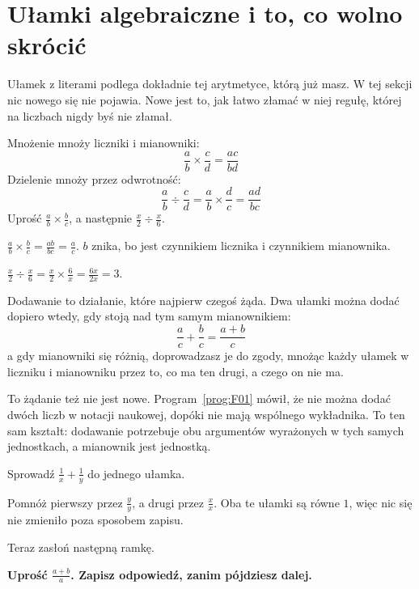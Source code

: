 \section{Ułamki algebraiczne i to, co wolno skrócić}
\label{sec:F02-fractions}

\begin{fr}
Ułamek z literami podlega dokładnie tej arytmetyce, którą już masz. W tej
sekcji nic nowego się nie pojawia. Nowe jest to, jak łatwo złamać w niej
regułę, której na liczbach nigdy byś nie złamał.

Mnożenie mnoży liczniki i mianowniki:
\[ \frac{a}{b} \times \frac{c}{d} = \frac{ac}{bd} \]
Dzielenie mnoży przez odwrotność:
\[ \frac{a}{b} \div \frac{c}{d} = \frac{a}{b} \times \frac{d}{c}
   = \frac{ad}{bc} \]
Uprość $\frac{a}{b} \times \frac{b}{c}$, a następnie
$\frac{x}{2} \div \frac{x}{6}$.
\dotline
\nextframe
\end{fr}

\begin{fr}
\begin{ansblock}
$\frac{a}{b} \times \frac{b}{c} = \frac{ab}{bc} = \frac{a}{c}$. $b$
znika, bo jest czynnikiem licznika i czynnikiem mianownika.

$\frac{x}{2} \div \frac{x}{6} = \frac{x}{2} \times \frac{6}{x}
= \frac{6x}{2x} = 3$.
\end{ansblock}

Dodawanie to działanie, które najpierw czegoś żąda. Dwa ułamki można dodać
dopiero wtedy, gdy stoją nad tym samym mianownikiem:
\[ \frac{a}{c} + \frac{b}{c} = \frac{a + b}{c} \]
a gdy mianowniki się różnią, doprowadzasz je do zgody, mnożąc każdy ułamek w
liczniku i mianowniku przez to, co ma ten drugi, a czego on nie ma.

To żądanie też nie jest nowe. Program~\ref{prog:F01} mówił, że nie można dodać
dwóch liczb w notacji naukowej, dopóki nie mają wspólnego wykładnika. To ten
sam kształt: dodawanie potrzebuje obu argumentów wyrażonych w tych samych
jednostkach, a mianownik jest jednostką.

Sprowadź $\frac{1}{x} + \frac{1}{y}$ do jednego ułamka.
\nextframe
\end{fr}

\begin{fr}
Pomnóż pierwszy przez $\frac{y}{y}$, a drugi przez $\frac{x}{x}$. Oba te
ułamki są równe $1$, więc nic się nie zmieniło poza sposobem zapisu.

Teraz zasłoń następną ramkę.

\textbf{Uprość $\frac{a + b}{a}$. Zapisz odpowiedź, zanim pójdziesz dalej.}
\dotline
\nextframe
\end{fr}

